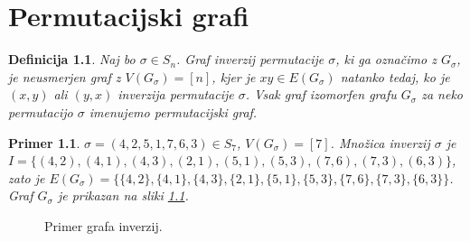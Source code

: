 \documentclass[a4paper, 12pt]{book}
\newtheorem{definicija}{Definicija}[chapter]
\newtheorem{primer}{Primer}[chapter]
\begin{document}
\chapter{ Permutacijski grafi }

\begin{definicija}
    Naj bo $\sigma \in S_n$. Graf inverzij permutacije $\sigma$, ki ga označimo z $G_{\sigma}$, je neusmerjen graf z $V(G_{\sigma}) = [n]$, kjer je $xy \in E(G_{\sigma})$ natanko tedaj, ko je $(x, y)$ ali $(y, x)$ inverzija permutacije $\sigma$. Vsak graf izomorfen grafu $G_{\sigma}$ za neko permutacijo $\sigma$ imenujemo permutacijski graf.
\end{definicija}

\begin{primer}
    $\sigma = (4, 2, 5, 1, 7, 6, 3) \in S_7$, $V(G_{\sigma}) =[7]$. Množica inverzij $\sigma$ je
    $I = \{ (4, 2), (4, 1), (4, 3), (2, 1), (5, 1), (5, 3), (7, 6), (7, 3), (6, 3) \}$,
    zato je $E(G_{\sigma}) = \{ \{ 4, 2 \}, \{ 4, 1 \}, \{ 4, 3 \}, \{ 2, 1 \}, \{ 5, 1 \}, \{ 5, 3 \}, \{ 7, 6 \}, \{ 7, 3 \}, \{ 6, 3 \} \}$. Graf $G_{\sigma}$ je prikazan na sliki \ref{graf_inverzij}.
\end{primer}

\begin{figure}[h]
    \begin{center}        
    \end{center}
    \caption{Primer grafa inverzij.}
    \label{graf_inverzij}
\end{figure}
\end{document}
